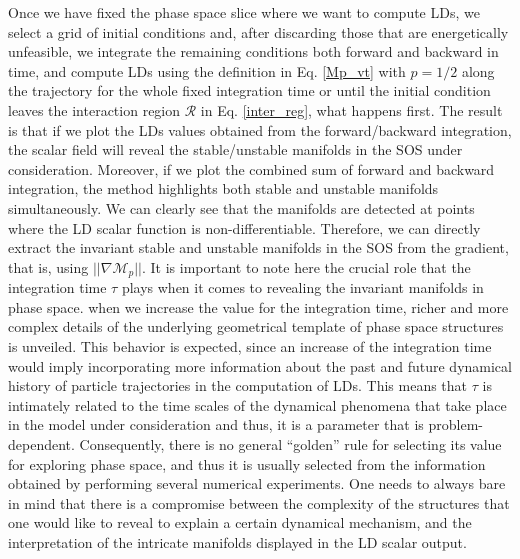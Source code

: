 \documentclass[8pt]{article}
\begin{document}
Once we have fixed the phase space slice where we want to compute LDs, we select a grid of initial conditions and, after discarding those that are energetically unfeasible, we integrate the remaining conditions both forward and backward in time, and compute LDs using the definition in Eq. \eqref{Mp_vt} with $p = 1/2$ along the trajectory for the whole fixed integration time or until the initial condition leaves the interaction region $\mathcal{R}$ in Eq. \eqref{inter_reg}, what happens first. The result is that if we plot the LDs values obtained from the forward/backward integration, the scalar field will reveal the stable/unstable manifolds in the SOS under consideration. Moreover, if we plot the combined sum of forward and backward integration, the method highlights both stable and unstable manifolds simultaneously. We can clearly see that the manifolds are detected at points where the LD scalar function is non-differentiable. Therefore, we can directly extract the invariant stable and unstable manifolds in the SOS from the gradient, that is, using $||\nabla \mathcal{M}_p||$. It is important to note here the crucial role that the integration time $\tau$ plays when it comes to revealing the invariant manifolds in phase space. when we increase the value for the integration time, richer and more complex details of the underlying geometrical template of phase space structures is unveiled. This behavior is expected, since an increase of the integration time would imply incorporating more information about the past and future dynamical history of particle trajectories in the computation of LDs. This means that $\tau$ is intimately related to the time scales of the dynamical phenomena that take place in the model under consideration and thus, it is a parameter that is problem-dependent. Consequently, there is no general ``golden'' rule for selecting its value for exploring phase space, and thus it is usually selected from the information obtained by performing several numerical experiments. One needs to always bare in mind that there is a compromise between the complexity of the structures that one would like to reveal to explain a certain dynamical mechanism, and the interpretation of the intricate manifolds displayed in the LD scalar output. 
\end{document}
